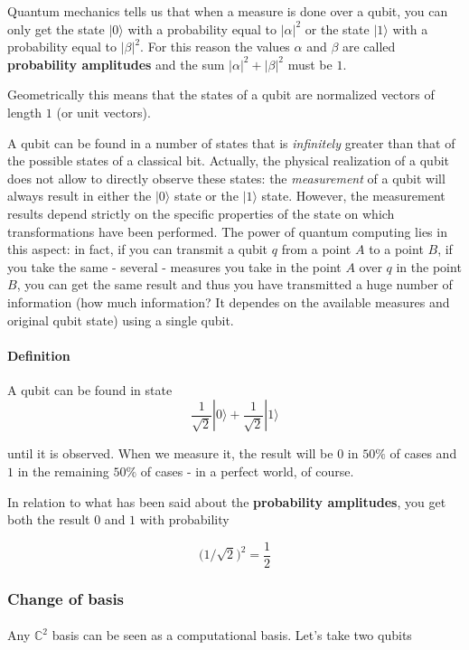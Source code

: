 \documentclass[a4paper,10pt]{article}
\begin{document}
Quantum mechanics tells us that when a measure is done over a qubit, you can only get the state $|0\rangle$ with a probability equal to $|\alpha|^2$ or the state $|1\rangle$ with a probability equal to $|\beta|^2$. For this reason the values $\alpha$ and $\beta$ are called \textbf{probability amplitudes} and the sum $|\alpha|^2 + |\beta|^2$ must be $1$. 

Geometrically this means that the states of a qubit are normalized vectors of length $1$ (or unit vectors).

A qubit can be found in a number of states that is \textit{infinitely} greater than that of the possible states of a classical bit. Actually, the physical realization of a qubit does not allow to directly observe these states: the \textit{measurement} of a qubit will always result in either the $|0\rangle$ state or the $|1\rangle$ state. However, the measurement results depend strictly on the specific properties of the state on which transformations have been performed. The power of quantum computing lies in this aspect: in fact, if you can transmit a qubit $q$ from a point $A$ to a point $B$, if you take the same - several - measures you take in the point $A$ over $q$ in the point $B$, you can get the same result and thus you have transmitted a huge number of information (how much information? It dependes on the available measures and original qubit state) using a single qubit.

\paragraph{Definition} A qubit can be found in state
$$\frac{1}{\sqrt{2}}|0\rangle + \frac{1}{\sqrt{2}}|1\rangle$$

until it is observed. When we measure it, the result will be $0$ in $50\%$ of cases and $1$ in the remaining $50\%$ of cases - in a perfect world, of course. 

In relation to what has been said about the \textbf{probability amplitudes}, you get both the result $0$ and $1$ with probability

$${(1/\sqrt{2}})^2 = \frac{1}{2}$$

\subsubsection{Change of basis}

\paragraph{} Any ${\mathbb{C}}^2$ basis can be seen as a computational basis. Let's take two qubits
\end{document}
